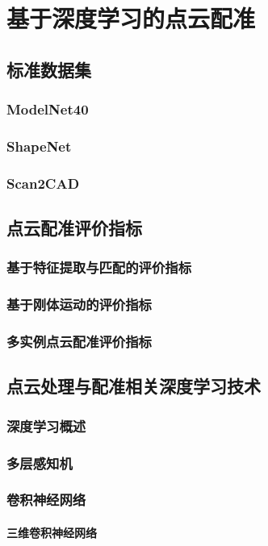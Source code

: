 \chapter{基于深度学习的点云配准}

\section{标准数据集}
\subsection{ModelNet40}
\subsection{ShapeNet}
\subsection{Scan2CAD}

\section{点云配准评价指标}
\subsection{基于特征提取与匹配的评价指标}
\subsection{基于刚体运动的评价指标}
\subsection{多实例点云配准评价指标}

\section{点云处理与配准相关深度学习技术}
\subsection{深度学习概述}
\subsection{多层感知机}
\subsection{卷积神经网络}
\subsubsection{三维卷积神经网络}
